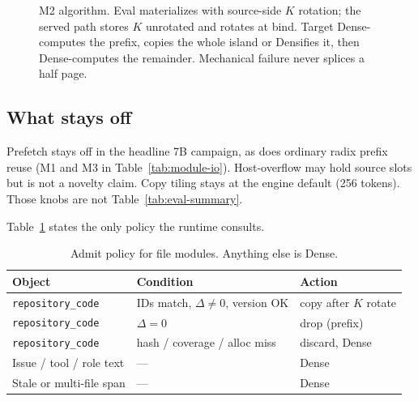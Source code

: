 \begin{figure}[ht]
\centering
\resizebox{\columnwidth}{!}{}
\caption{M2 algorithm. Eval materializes with source-side $K$
rotation; the served path stores $K$ unrotated and rotates at bind.
Target Dense-computes the prefix, copies the whole island or Densifies
it, then Dense-computes the remainder. Mechanical failure never
splices a half page.}
\label{fig:algo-copy}
\end{figure}

\subsection{What stays off}

Prefetch stays off in the headline 7B campaign, as does ordinary radix
prefix reuse (M1 and M3 in Table~\ref{tab:module-io}). Host-overflow may
hold source slots but is not a novelty claim. Copy tiling stays at the
engine default (256 tokens). Those knobs are not Table~\ref{tab:eval-summary}.

Table~\ref{tab:reuse-policy} states the only policy the runtime consults.

\begin{table}[t]
\centering
\scriptsize
\setlength{\tabcolsep}{3pt}
\caption{Admit policy for file modules. Anything else is Dense.}
\label{tab:reuse-policy}
\begin{tabular}{@{}p{}p{}p{}@{}}
\toprule
\textbf{Object} & \textbf{Condition} & \textbf{Action} \\
\midrule
\texttt{repository\_code} & IDs match, $\Delta\neq 0$, version OK & copy after $K$ rotate \\
\texttt{repository\_code} & $\Delta = 0$ & drop (prefix) \\
\texttt{repository\_code} & hash / coverage / alloc miss & discard, Dense \\
Issue / tool / role text & --- & Dense \\
Stale or multi-file span & --- & Dense \\
\bottomrule
\end{tabular}
\end{table}
